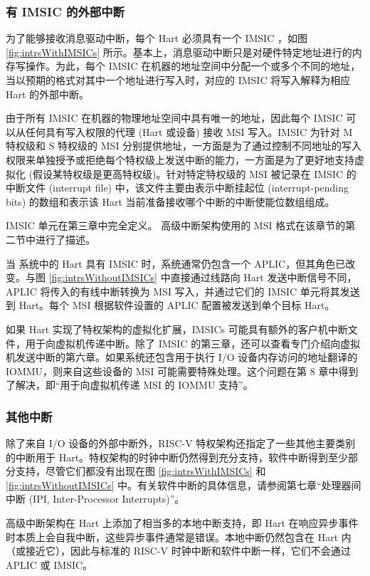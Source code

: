 \begin{translation}
\subsubsection{有 IMSIC 的外部中断}

为了能够接收消息驱动中断，每个 {\RISCV} Hart 必须具有一个 IMSIC ，如图 \ref{fig:intrsWithIMSICs} 所示。基本上，消息驱动中断只是对硬件特定地址进行的内存写操作。为此，每个 IMSIC 在机器的地址空间中分配一个或多个不同的地址，当以预期的格式对其中一个地址进行写入时，对应的 IMSIC 将写入解释为相应 Hart 的外部中断。

由于所有 IMSIC 在机器的物理地址空间中具有唯一的地址，因此每个 IMSIC 可以从任何具有写入权限的代理 (Hart 或设备) 接收 MSI 写入。IMSIC 为针对 M 特权级和 S 特权级的 MSI 分别提供地址，一方面是为了通过控制不同地址的写入权限来单独授予或拒绝每个特权级上发送中断的能力，一方面是为了更好地支持虚拟化 (假设某特权级是更高特权级)。针对特定特权级的 MSI 被记录在 IMSIC 的中断文件 (interrupt file) 中，该文件主要由表示中断挂起位 (interrupt-pending bits) 的数组和表示该 Hart 当前准备接收哪个中断的中断使能位数组组成。

IMSIC 单元在第三章中完全定义。{\RISCV} 高级中断架构使用的 MSI 格式在该章节的第二节中进行了描述。

当 {\RISCV} 系统中的 Hart 具有 IMSIC 时，系统通常仍包含一个 APLIC，但其角色已改变。与图 \ref{fig:intrsWithoutIMSICs} 中直接通过线路向 Hart 发送中断信号不同，APLIC 将传入的有线中断转换为 MSI 写入，并通过它们的 IMSIC 单元将其发送到 Hart。每个 MSI 根据软件设置的 APLIC 配置被发送到单个目标 Hart。

如果 {\RISCV} Hart 实现了特权架构的虚拟化扩展，IMSICs 可能具有额外的客户机中断文件，用于向虚拟机传递中断。除了 IMSIC 的第三章，还可以查看专门介绍向虚拟机发送中断的第六章。如果系统还包含用于执行 I/O 设备内存访问的地址翻译的 IOMMU，则来自这些设备的 MSI 可能需要特殊处理。这个问题在第 8 章中得到了解决，即“用于向虚拟机传递 MSI 的 IOMMU 支持”。

\subsubsection{其他中断}

除了来自 I/O 设备的外部中断外，RISC-V 特权架构还指定了一些其他主要类别的中断用于 Hart。特权架构的时钟中断仍然得到充分支持，软件中断得到至少部分支持，尽管它们都没有出现在图 \ref{fig:intrsWithIMSICs} 和 \ref{fig:intrsWithoutIMSICs} 中。有关软件中断的具体信息，请参阅第七章“处理器间中断 (IPI, Inter-Processor Interrupts)”。

高级中断架构在 Hart 上添加了相当多的本地中断支持，即 Hart 在响应异步事件时本质上会自我中断，这些异步事件通常是错误。本地中断仍然包含在 Hart 内（或接近它），因此与标准的 RISC-V 时钟中断和软件中断一样，它们不会通过 APLIC 或 IMSIC。


\end{translation}
